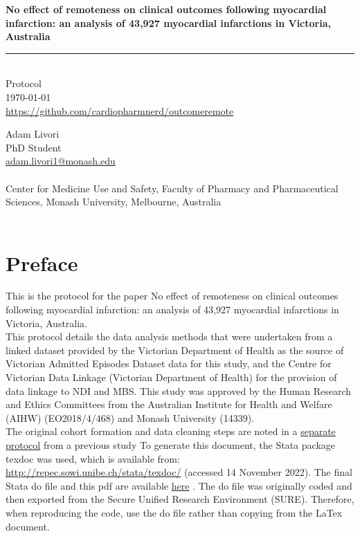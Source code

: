 \documentclass[11pt]{article}
\newcommand{\thedate}{\today}
\begin{document}
\begin{titlepage}
  \begin{flushright}
        \Huge
        \textbf{No effect of remoteness on clinical outcomes following myocardial infarction: an analysis of 43,927 myocardial infarctions in Victoria, Australia}
\color{violet}
\rule{16cm}{2mm} \\
\Large
\color{black}
Protocol \\
\thedate \\
\color{blue}
\url{https://github.com/cardiopharmnerd/outcomeremote} \\
\color{black}
       \vfill
    \end{flushright}
        \Large

\noindent
Adam Livori \\
PhD Student \\
\color{blue}
\href{mailto:adam.livori1@Monash.edu}{adam.livori1@monash.edu} \\ 
\color{black}
\\
Center for Medicine Use and Safety, Faculty of Pharmacy and Pharmaceutical Sciences, Monash University, Melbourne, Australia \\
\\
\end{titlepage}

\pagebreak
\tableofcontents
\pagebreak

\pagebreak
\section{Preface}

This is the protocol for the paper No effect of remoteness on clinical outcomes following myocardial infarction: an analysis of 43,927 myocardial infarctions in Victoria, Australia. \\
This protocol details the data analysis methods that were undertaken from a linked dataset provided by the Victorian Department of Health as the source of Victorian Admitted Episodes Dataset data for this study, and the Centre for Victorian Data Linkage (Victorian Department of Health) for the provision of data linkage to NDI and MBS. This study was approved by the Human Research and Ethics Committees from the Australian Institute for Health and Welfare (AIHW) (EO2018/4/468) and Monash University (14339). \\
The original cohort formation and data cleaning steps are noted in a \color{blue} \href{https://github.com/cardiopharmnerd/medsremote}{separate protocol} from a previous study \color{black}
To generate this document, the Stata package texdoc was used, which is available from: \color{blue} \url{http://repec.sowi.unibe.ch/stata/texdoc/} \color{black} (accessed 14 November 2022). The final Stata do file and this pdf are available \color{blue} \href{https://github.com/cardiopharmnerd/outcomeremote}{here} \color{black}. The do file was originally coded and then exported from the Secure Unified Research Environment (SURE). Therefore, when reproducing the code, use the do file rather than copying from the LaTex document. 
\end{document}

